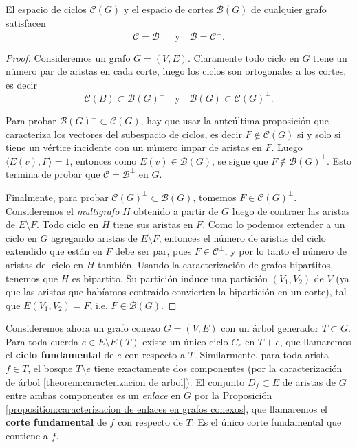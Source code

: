 \documentclass[../main.tex]{subfiles}
\begin{document}
\begin{theorem}\label{th:apendice subespacio de ciclos y subespacio de cortes son mutuamente ortogonales entre si}
El espacio de ciclos $\mathcal{C}(G)$ y el espacio de cortes $\mathcal{B}(G)$ de cualquier grafo satisfacen
\[
    \mathcal C = \mathcal B^{\perp} \quad \text{y} \quad \mathcal B = \mathcal C^{\perp}.
\]
\end{theorem}
\begin{proof}
Consideremos un grafo $G = (V,E)$. Claramente todo ciclo en $G$ tiene un número par de aristas en cada corte, luego los ciclos son ortogonales a los cortes, es decir
$$
\mathcal{C}(B) \subset \mathcal{B}(G)^\perp \quad \text{y} \quad \mathcal B (G)  \subset \mathcal{C}(G)^\perp.
$$

Para probar $\mathcal{B}(G)^\perp \subset \mathcal C (G)$, hay que usar la anteúltima proposición que caracteriza los vectores del subespacio de ciclos, es decir $F \not \in \mathcal{C}(G)$ si y solo si tiene un vértice incidente con un número impar de aristas en $F$. Luego $\langle E(v), F \rangle = 1$, entonces como $E(v) \in \mathcal{B}(G)$, se sigue que $F \not \in \mathcal{B}(G)^\perp$. Esto termina de probar que $\mathcal C = \mathcal B ^\perp$ en $G$.

Finalmente, para probar $\mathcal C (G)^\perp \subset \mathcal B (G)$, tomemos $F \in \mathcal C (G)^\perp$. Consideremos el \textit{multigrafo} $H$ obtenido a partir de $G$ luego de contraer las aristas de $E \setminus F$. Todo ciclo en $H$ tiene sus aristas en $F$. Como lo podemos extender a un ciclo en $G$ agregando aristas de $E\setminus F$, entonces el número de aristas del ciclo extendido que están en $F$ debe ser par, pues $F \in \mathcal C ^\perp$, y por lo tanto el número de aristas del ciclo en $H$ también. Usando la caracterización de grafos bipartitos, tenemos que $H$ es bipartito. Su partición induce una partición $(V_1,V_2)$ de $V$ (ya que las aristas que habíamos contraído convierten la bipartición en un corte), tal que $E(V_1,V_2) = F$, i.e. $F \in \mathcal{B}(G)$.
\end{proof}



Consideremos ahora un grafo conexo $G = (V,E)$ con un árbol generador $T \subset G$. Para toda cuerda $e \in E \setminus E(T)$ existe un único ciclo $C_e$ en $T+e$, que llamaremos el \textbf{ciclo fundamental} de $e$ con respecto a $T$. Similarmente, para toda arista $f \in T$, el bosque $T \setminus e$ tiene exactamente dos componentes (por la caracterización de árbol \ref{theorem:caracterizacion de arbol}). El conjunto $D_f \subset E$ de aristas de $G$ entre ambas componentes es un \textit{enlace} en $G$ por la Proposición \ref{proposition:caracterizacion de enlaces en grafos conexos}, que llamaremos el \textbf{corte fundamental} de $f$ con respecto de $T$. Es el único corte fundamental que contiene a $f$.
\end{document}

